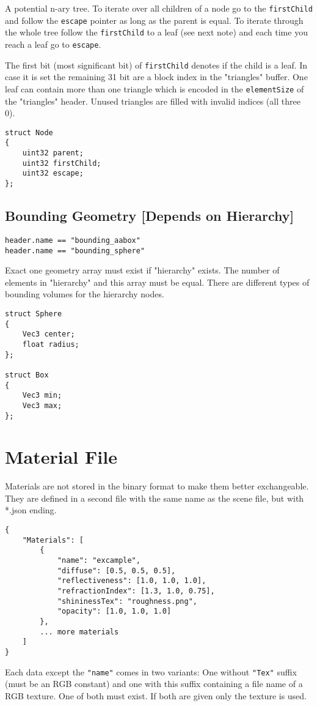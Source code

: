 \documentclass[english,10pt,a4paper,twocolumn,colorscheme=green]{orarticle}
\begin{document}
	A potential n-ary tree. To iterate over all children of a node go to the \lstinline|firstChild| and follow the \lstinline|escape| pointer as long as the parent is equal. To iterate through the whole tree follow the \lstinline|firstChild| to a leaf (see next note) and each time you reach a leaf go to \lstinline|escape|.
	
	The first bit (most significant bit) of \lstinline|firstChild| denotes if the child is a leaf. In case it is set the remaining 31 bit are a block index in the "triangles" buffer. One leaf can contain more than one triangle which is encoded in the \lstinline|elementSize| of the "triangles" header. Unused triangles are filled with invalid indices (all three 0).
	\begin{lstlisting}
struct Node
{
	uint32 parent;
	uint32 firstChild;
	uint32 escape;
};
	\end{lstlisting}
	
	\subsection{Bounding Geometry [Depends on Hierarchy]}
	\lstinline|header.name == "bounding_aabox"|\\
	\lstinline|header.name == "bounding_sphere"|
	
	Exact one geometry array must exist if "hierarchy" exists. The number of elements in "hierarchy" and this array must be equal. There are different types of bounding volumes for the hierarchy nodes.
	\begin{lstlisting}
struct Sphere
{
	Vec3 center;
	float radius;
};

struct Box
{
	Vec3 min;
	Vec3 max;
};
	\end{lstlisting}
	
	
		
	\section{Material File}
	Materials are not stored in the binary format to make them better exchangeable. They are defined in a second file with the same name as the scene file, but with *.json ending.
	\begin{lstlisting}
{
	"Materials": [
		{
			"name": "excample",
			"diffuse": [0.5, 0.5, 0.5],
			"reflectiveness": [1.0, 1.0, 1.0],
			"refractionIndex": [1.3, 1.0, 0.75],
			"shininessTex": "roughness.png",
			"opacity": [1.0, 1.0, 1.0]
		},		
		... more materials
	]
}
	\end{lstlisting}
	Each data except the \lstinline|"name"| comes in two variants: One without \lstinline|"Tex"| suffix (must be an RGB constant) and one with this suffix containing a file name of a RGB texture. One of both must exist. If both are given only the texture is used.
	
\end{document}
